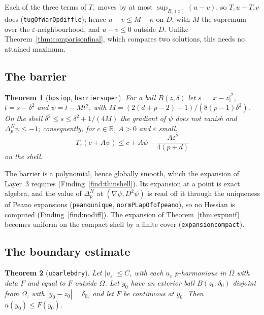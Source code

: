 \documentclass[11pt,reqno]{amsart}
\newcommand{\LEANREF}[1]{\texttt{\small\def\_{\textunderscore\allowbreak}#1}}
\newcommand{\R}{\mathbb{R}}
\newcommand{\eps}{\varepsilon}
\newcommand{\pnlap}{\Delta_p^{N}}
\newcommand{\Op}{T_\eps}
\theoremstyle{plain}
\newtheorem{theorem}{Theorem}[section]
\theoremstyle{definition}
\begin{document}
Each of the three terms of $\Op$ moves by at most $\sup_{B_\eps(x)}(u - v)$, so
$\Op u - \Op v$ does (\LEANREF{tugOfWarOp\_diff\_le}); hence
$u - v \le M - \kappa$ on $D$, with $M$ the supremum over the
$\eps$-neighbourhood, and $u - v \le 0$ outside $D$. Unlike
Theorem~\ref{thm:comparisonfinal}, which compares two solutions, this needs no
attained maximum.

\subsection{The barrier}

\begin{theorem}[\LEANREF{bpsi\_op}, \LEANREF{barrier\_super}]\label{thm:barrier}
For a ball $B(z, \delta)$ let $s = |x - z|^2$, $t = s - \delta^2$ and
$\psi = t - M t^2$, with $M = (2(d + p - 2) + 1)/(8(p - 1)\delta^2)$. On the
shell $\delta^2 \le s \le \delta^2 + 1/(4M)$ the gradient of $\psi$ does not
vanish and $\pnlap \psi \le -1$; consequently, for $c \in \R$, $A > 0$ and
$\eps$ small,
\[
  \Op(c + A\psi) \le c + A\psi - \frac{A\eps^2}{4(p + d)}
\]
on the shell.
\end{theorem}

The barrier is a polynomial, hence globally smooth, which the expansion of
Layer~3 requires (Finding~\ref{find:thinshell}). Its expansion at a point is
exact algebra, and the value of $\pnlap$ at $(\nabla\psi, D^2\psi)$ is read off it
through the uniqueness of Peano expansions (\LEANREF{peano\_unique},
\LEANREF{normPLapOf\_of\_peano}), so no Hessian is computed
(Finding~\ref{find:nodiff}). The expansion of Theorem~\ref{thm:expunif} becomes
uniform on the compact shell by a finite cover (\LEANREF{expansion\_compact}).

\subsection{The boundary estimate}

\begin{theorem}[\LEANREF{ubar\_le\_bdry}]\label{thm:bdry}
Let $|u_\eps| \le C$, with each $u_\eps$ $p$-harmonious in $\Omega$ with data
$F$ and equal to $F$ outside $\Omega$. Let $y_0$ have an exterior ball
$B(z_0, \delta_0)$ disjoint from $\Omega$, with $|y_0 - z_0| = \delta_0$, and let
$F$ be continuous at $y_0$. Then $\overline u(y_0) \le F(y_0)$.
\end{theorem}
\end{document}
